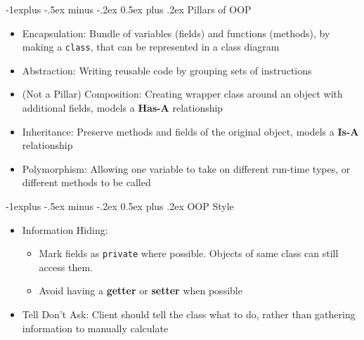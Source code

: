 \documentclass[10pt, landscape]{article}
\makeatletter
\renewcommand{\section}{\@startsection{section}{1}{0mm}%
                                {-1ex plus -.5ex minus -.2ex}%
                                {0.5ex plus .2ex}%
                                {\normalfont\large\bfseries}}
\renewcommand{\section}{\@startsection{section}{2}{0mm}%
                                {-1explus -.5ex minus -.2ex}%
                                {0.5ex plus .2ex}%
                                {\normalfont\normalsize\bfseries}}
\makeatother
\begin{document}
\begin{multicols*}{4}
\section{Pillars of OOP}
\begin{itemize}
    \item Encapsulation: Bundle of variables (fields) and functions (methods), by making a \verb|class|, that can be represented in a class diagram
    \item Abstraction: Writing reusable code by grouping sets of instructions
    \item (Not a Pillar) Composition: Creating wrapper class around an object with additional fields, models a \textbf{Has-A} relationship
    \item Inheritance: Preserve methods and fields of the original object, models a \textbf{Is-A} relationship
    \item Polymorphism: Allowing one variable to take on different run-time types, or different methods to be called
\end{itemize}

\section{OOP Style}
\begin{itemize}
    \item Information Hiding:
    \begin{itemize}
        \item Mark fields as \verb|private| where possible. Objects of same class can still access them.
        \item Avoid having a \textbf{getter} or \textbf{setter} when possible
    \end{itemize}
    \item Tell Don't Ask: Client should tell the class what to do, rather than gathering information to manually calculate
\end{itemize}


\end{multicols*}
\end{document}
